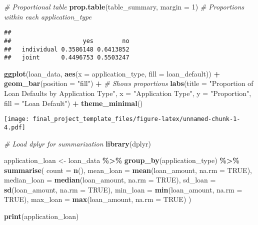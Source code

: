 \documentclass[
]{article}
\newenvironment{Shaded}{\begin{snugshade}}{\end{snugshade}}
\newcommand{\AttributeTok}[1]{\textcolor[rgb]{0.13,0.29,0.53}{#1}}
\newcommand{\CommentTok}[1]{\textcolor[rgb]{0.56,0.35,0.01}{\textit{#1}}}
\newcommand{\ConstantTok}[1]{\textcolor[rgb]{0.56,0.35,0.01}{#1}}
\newcommand{\DecValTok}[1]{\textcolor[rgb]{0.00,0.00,0.81}{#1}}
\newcommand{\FunctionTok}[1]{\textcolor[rgb]{0.13,0.29,0.53}{\textbf{#1}}}
\newcommand{\NormalTok}[1]{#1}
\newcommand{\OtherTok}[1]{\textcolor[rgb]{0.56,0.35,0.01}{#1}}
\newcommand{\SpecialCharTok}[1]{\textcolor[rgb]{0.81,0.36,0.00}{\textbf{#1}}}
\newcommand{\StringTok}[1]{\textcolor[rgb]{0.31,0.60,0.02}{#1}}
\begin{document}
\begin{Shaded}
\begin{Highlighting}[]
\CommentTok{\# Proportional table}
\FunctionTok{prop.table}\NormalTok{(table\_summary, }\AttributeTok{margin =} \DecValTok{1}\NormalTok{)  }\CommentTok{\# Proportions within each application\_type}
\end{Highlighting}
\end{Shaded}

\begin{verbatim}
##             
##                    yes        no
##   individual 0.3586148 0.6413852
##   joint      0.4496753 0.5503247
\end{verbatim}

\begin{Shaded}
\begin{Highlighting}[]
\FunctionTok{ggplot}\NormalTok{(loan\_data, }\FunctionTok{aes}\NormalTok{(}\AttributeTok{x =}\NormalTok{ application\_type, }\AttributeTok{fill =}\NormalTok{ loan\_default)) }\SpecialCharTok{+}
  \FunctionTok{geom\_bar}\NormalTok{(}\AttributeTok{position =} \StringTok{"fill"}\NormalTok{) }\SpecialCharTok{+}  \CommentTok{\# Shows proportions}
  \FunctionTok{labs}\NormalTok{(}\AttributeTok{title =} \StringTok{"Proportion of Loan Defaults by Application Type"}\NormalTok{,}
       \AttributeTok{x =} \StringTok{"Application Type"}\NormalTok{,}
       \AttributeTok{y =} \StringTok{"Proportion"}\NormalTok{,}
       \AttributeTok{fill =} \StringTok{"Loan Default"}\NormalTok{) }\SpecialCharTok{+}
  \FunctionTok{theme\_minimal}\NormalTok{()}
\end{Highlighting}
\end{Shaded}

\texttt{[image: final\_project\_template\_files/figure-latex/unnamed-chunk-1-4.pdf]}

\begin{Shaded}
\begin{Highlighting}[]
\CommentTok{\# Load dplyr for summarization}
\FunctionTok{library}\NormalTok{(dplyr)}

\NormalTok{application\_loan }\OtherTok{\textless{}{-}}\NormalTok{ loan\_data }\SpecialCharTok{\%\textgreater{}\%}
  \FunctionTok{group\_by}\NormalTok{(application\_type) }\SpecialCharTok{\%\textgreater{}\%}
  \FunctionTok{summarise}\NormalTok{(}
    \AttributeTok{count =} \FunctionTok{n}\NormalTok{(),}
    \AttributeTok{mean\_loan =} \FunctionTok{mean}\NormalTok{(loan\_amount, }\AttributeTok{na.rm =} \ConstantTok{TRUE}\NormalTok{),}
    \AttributeTok{median\_loan =} \FunctionTok{median}\NormalTok{(loan\_amount, }\AttributeTok{na.rm =} \ConstantTok{TRUE}\NormalTok{),}
    \AttributeTok{sd\_loan =} \FunctionTok{sd}\NormalTok{(loan\_amount, }\AttributeTok{na.rm =} \ConstantTok{TRUE}\NormalTok{),}
    \AttributeTok{min\_loan =} \FunctionTok{min}\NormalTok{(loan\_amount, }\AttributeTok{na.rm =} \ConstantTok{TRUE}\NormalTok{),}
    \AttributeTok{max\_loan =} \FunctionTok{max}\NormalTok{(loan\_amount, }\AttributeTok{na.rm =} \ConstantTok{TRUE}\NormalTok{)}
\NormalTok{  )}

\FunctionTok{print}\NormalTok{(application\_loan)}
\end{Highlighting}
\end{Shaded}
\end{document}
